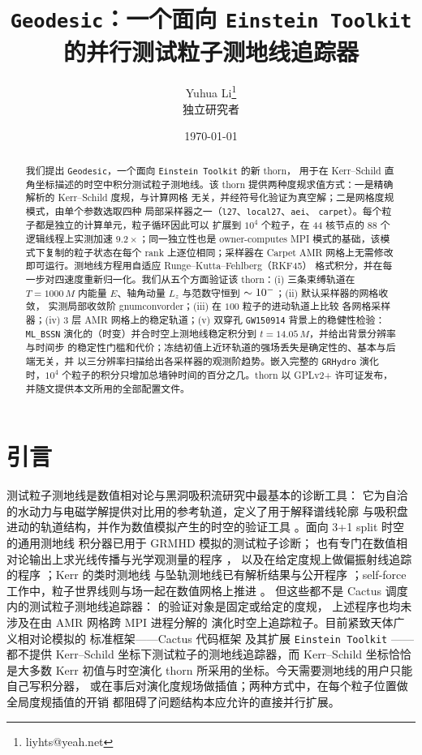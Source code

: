 \documentclass[11pt,UTF8]{ctexart}
\title{\texttt{Geodesic}：一个面向 \texttt{Einstein Toolkit} 的并行测试粒子测地线追踪器}
\author{Yuhua Li\thanks{liyhts@yeah.net} \\
{\small 独立研究者}}
\date{\today}
\newcommand{\num}[1]{\csname gnum#1\endcsname}
\begin{document}
\maketitle

\begin{abstract}
我们提出 \texttt{Geodesic}，一个面向 \texttt{Einstein Toolkit} 的新 thorn，
用于在 Kerr--Schild 直角坐标描述的时空中积分测试粒子测地线。该 thorn
提供两种度规求值方式：一是精确解析的 Kerr--Schild 度规，与计算网格
无关，并经符号化验证为真空解；二是网格度规模式，由单个参数选取四种
局部采样器之一（\texttt{l27}、\texttt{local27}、\texttt{aei}、
\texttt{carpet}）。每个粒子都是独立的计算单元，粒子循环因此可以
扩展到 $10^4$ 个粒子，在 44 核节点的 88 个逻辑线程上实测加速
$9.2\times$；同一独立性也是 owner-computes MPI
模式的基础，该模式下复制的粒子状态在每个 rank 上逐位相同；采样器在
Carpet AMR 网格上无需修改即可运行。测地线方程用自适应 Runge--Kutta--Fehlberg（RKF45）
格式积分，并在每一步对四速度重新归一化。我们从五个方面验证该
thorn：(i) 三条束缚轨道在 $T=1000\,M$ 内能量 $E$、轴角动量 $L_z$
与范数守恒到 $\sim 10^{-\num{consexp}}$；(ii) 默认采样器的网格收敛，
实测局部收敛阶 \num{convorder}；(iii) 在 $100$ 粒子的进动轨道上比较
各网格采样器；(iv) 3 层 AMR 网格上的稳定轨道；(v) 双穿孔 \texttt{GW150914} 背景上的稳健性检验：\texttt{ML\_BSSN}
演化的（时变）并合时空上测地线稳定积分到 $t=14.05\,M$，并给出背景分辨率与时间步
的稳定性门槛和代价；冻结初值上近环轨道的强场丢失是确定性的、基本与后端无关，并
以三分辨率扫描给出各采样器的观测阶趋势。嵌入完整的 \texttt{GRHydro} 演化时，$10^4$
个粒子的积分只增加总墙钟时间的百分之几。thorn 以 GPLv2+ 许可证发布，
并随文提供本文所用的全部配置文件。
\end{abstract}

\section{引言}

测试粒子测地线是数值相对论与黑洞吸积流研究中最基本的诊断工具\citep{poisson2004}：
它为自洽的水动力与电磁学解提供对比用的参考轨道\citep{bz1977}，定义了用于解释谱线轮廓
与吸积盘进动的轨道结构\citep{bardeen1973,gralla2020}，并作为数值模拟产生的时空的验证工具
\citep{kerr1963,bardeen1972,wilkins1972}。面向 3+1 split 时空的通用测地线
积分器已用于 GRMHD 模拟的测试粒子诊断\citep{bacchini2018,bacchini2019}；
也有专门在数值相对论输出上求光线传播与光学观测量的程序 \citep{grasso2022}，
以及在给定度规上做偏振射线追踪的程序 \citep{aimar2024}；Kerr 的类时测地线
与坠轨测地线已有解析结果与公开程序 \citep{park2024,dyson2023}；self-force
工作中，粒子世界线则与场一起在数值网格上推进 \citep{vretinaris2026}。
但这些都不是 Cactus 调度内的测试粒子测地线追踪器：
\citet{bacchini2018,bacchini2019} 的验证对象是固定或给定的度规，
上述程序也均未涉及在由 AMR 网格跨 MPI 进程分解的
演化时空上追踪粒子。目前紧致天体广义相对论模拟的
标准框架——Cactus 代码框架 \citep{cactusweb} 及其扩展
\texttt{Einstein Toolkit} \citep{loeffler2012}——都不提供 Kerr--Schild
坐标下测试粒子的测地线追踪器，而 Kerr--Schild 坐标恰恰是大多数 Kerr
初值与时空演化 thorn 所采用的坐标。今天需要测地线的用户只能自己写积分器，
或在事后对演化度规场做插值；两种方式中，在每个粒子位置做全局度规插值的开销
都阻碍了问题结构本应允许的直接并行扩展。
\end{document}
